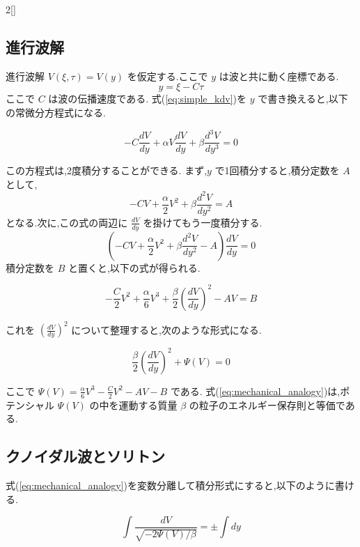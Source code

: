\documentclass[a4paper,10pt]{article}
\begin{document}
\begin{multicols}{2}[\raggedcolumns]
\subsection{進行波解}
進行波解 $V(\xi, \tau) = V(y)$ を仮定する.ここで $y$ は波と共に動く座標である.
\begin{equation}
    y = \xi - C \tau
\end{equation}
ここで $C$ は波の伝播速度である.
式(\ref{eq:simple_kdv})を $y$ で書き換えると,以下の常微分方程式になる.

\begin{equation}
    -C \frac{d V}{d y} + \alpha V \frac{d V}{d y} + \beta \frac{d^3 V}{d y^3} = 0
\end{equation}

この方程式は,2度積分することができる.
まず,$y$ で1回積分すると,積分定数を $A$ として,
\begin{equation}
    -C V + \frac{\alpha}{2} V^2 + \beta \frac{d^2 V}{d y^2} = A
\end{equation}
となる.次に,この式の両辺に $\frac{d V}{d y}$ を掛けてもう一度積分する.
\begin{equation}
    \left( -C V + \frac{\alpha}{2} V^2 + \beta \frac{d^2 V}{d y^2} - A \right) \frac{d V}{d y} = 0
\end{equation}
積分定数を $B$ と置くと,以下の式が得られる.

\begin{equation}
    -\frac{C}{2} V^2 + \frac{\alpha}{6} V^3 + \frac{\beta}{2} \left( \frac{d V}{d y} \right)^2 - AV = B
\end{equation}

これを $\left( \frac{d V}{d y} \right)^2$ について整理すると,次のような形式になる.

\begin{equation}
    \frac{\beta}{2} \left( \frac{d V}{d y} \right)^2 + \Psi(V) = 0 \label{eq:mechanical_analogy}
\end{equation}

ここで $\Psi(V) = \frac{\alpha}{6} V^3 - \frac{C}{2} V^2 - AV - B$ である.
式(\ref{eq:mechanical_analogy})は,ポテンシャル $\Psi(V)$ の中を運動する質量 $\beta$ の粒子のエネルギー保存則と等価である.

\subsection{クノイダル波とソリトン}
式(\ref{eq:mechanical_analogy})を変数分離して積分形式にすると,以下のように書ける.

\begin{equation}
    \int \frac{dV}{\sqrt{-2\Psi(V)/\beta}} = \pm \int dy \label{eq:elliptic_integral}
\end{equation}


\end{multicols}
\end{document}
